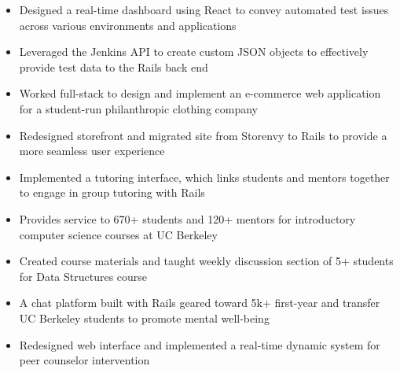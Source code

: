 \documentclass{resume}
\begin{document}
\begin{itemize}
\item Designed a real-time dashboard using React to convey automated test issues across various environments and applications
\item Leveraged the Jenkins API to create custom JSON objects to effectively provide test data to the Rails back end
\end{itemize}
\begin{itemize}
\item Worked full-stack to design and implement an e-commerce web application for a student-run philanthropic clothing company
\item Redesigned storefront and migrated site from Storenvy to Rails to provide a more seamless user experience
\end{itemize}
\begin{itemize}
\item Implemented a tutoring interface, which links students and mentors together to engage in group tutoring with Rails
\item Provides service to 670+ students and 120+ mentors for introductory computer science courses at UC Berkeley
\item Created course materials and taught weekly discussion section of 5+ students for Data Structures course
\end{itemize}
\begin{itemize}
\item A chat platform built with Rails geared toward 5k+ first-year and transfer UC Berkeley students to promote mental well-being
\item Redesigned web interface and implemented a real-time dynamic system for peer counselor intervention
\end{itemize}

\end{document}
